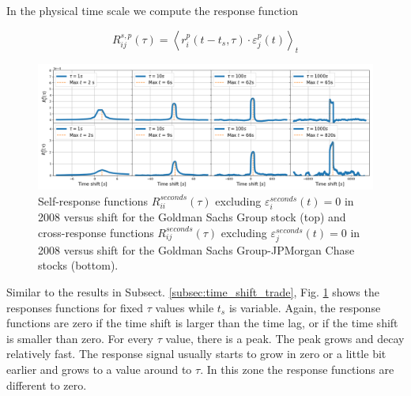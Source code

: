 In the physical time scale we compute the response function

\begin{equation}\label{eq:time_shift_physical}
    R_{ij}^{s, p}\left(\tau\right)=\left\langle r^{p}_{i}
    \left(t-t_{s},\tau\right) \cdot\varepsilon^{p}_{j}
    \left(t\right)\right\rangle _{t}
\end{equation}

\begin{figure}[htbp]
    \centering
    \includegraphics[width=\textwidth]{figures/04_shift_physical.png}
    \caption{Self-response functions $R_{ii}^{seconds}\left(\tau\right)$
             excluding $\varepsilon^{seconds}_{i}\left(t\right) = 0$ in 2008
             versus shift for the Goldman Sachs Group stock (top) and
             cross-response functions $R_{ij}^{seconds}\left(\tau\right)$
             excluding $\varepsilon^{seconds}_{j}\left(t\right) = 0$ in 2008
             versus shift for the Goldman Sachs Group-JPMorgan Chase stocks
             (bottom).}
    \label{fig:shift_physical_scale}
\end{figure}

Similar to the results in Subsect. \ref{subsec:time_shift_trade}, Fig. \ref{fig:shift_physical_scale}
shows the responses functions for fixed $\tau$ values while $t_{s}$ is variable.
Again, the response functions are zero if the time shift is larger than the time lag, or if
the time shift is smaller than zero.
For every $\tau$ value, there is a peak. The peak grows and decay relatively fast.
The response
signal usually starts to grow in zero or a little bit earlier and grows to
a value around to $\tau$. In this zone the response functions are different to zero.


